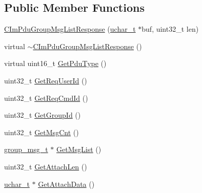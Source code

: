 \subsection*{Public Member Functions}
\begin{DoxyCompactItemize}
\item 
\hyperlink{class_c_im_pdu_group_msg_list_response_a1e526b7de285a573d42c16e79287ca5f}{C\+Im\+Pdu\+Group\+Msg\+List\+Response} (\hyperlink{base_2ostype_8h_a124ea0f8f4a23a0a286b5582137f0b8d}{uchar\+\_\+t} $\ast$buf, uint32\+\_\+t len)
\item 
virtual \hyperlink{class_c_im_pdu_group_msg_list_response_a66c67a972f82e1114fb48932d65821e7}{$\sim$\+C\+Im\+Pdu\+Group\+Msg\+List\+Response} ()
\item 
virtual uint16\+\_\+t \hyperlink{class_c_im_pdu_group_msg_list_response_a4cc29ba0e7f8f327b28ccb6cf76529f5}{Get\+Pdu\+Type} ()
\item 
uint32\+\_\+t \hyperlink{class_c_im_pdu_group_msg_list_response_aa5d272d89f606ba0fb471e8d6e459618}{Get\+Req\+User\+Id} ()
\item 
uint32\+\_\+t \hyperlink{class_c_im_pdu_group_msg_list_response_a3efb536a3ac49e21089091643a139180}{Get\+Req\+Cmd\+Id} ()
\item 
uint32\+\_\+t \hyperlink{class_c_im_pdu_group_msg_list_response_ae95297404c36d282c7c2b00df25bdd1a}{Get\+Group\+Id} ()
\item 
uint32\+\_\+t \hyperlink{class_c_im_pdu_group_msg_list_response_ab330110170293fa63f8e885bed0f8a96}{Get\+Msg\+Cnt} ()
\item 
\hyperlink{structgroup__msg__t}{group\+\_\+msg\+\_\+t} $\ast$ \hyperlink{class_c_im_pdu_group_msg_list_response_a256b1d9f2635270d238e8a22f00722fb}{Get\+Msg\+List} ()
\item 
uint32\+\_\+t \hyperlink{class_c_im_pdu_group_msg_list_response_a098432d4c0024c1d73ecdb0a0ef68cb4}{Get\+Attach\+Len} ()
\item 
\hyperlink{base_2ostype_8h_a124ea0f8f4a23a0a286b5582137f0b8d}{uchar\+\_\+t} $\ast$ \hyperlink{class_c_im_pdu_group_msg_list_response_a7285b0cf25eb722e2b8a3137493b66ce}{Get\+Attach\+Data} ()
\end{DoxyCompactItemize}
